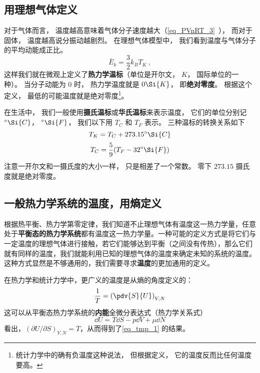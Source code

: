 

\subsection{用理想气体定义}
对于气体而言， 温度越高意味着气体分子速度越大（\autoref{eq_PVnRT_3}~）， 而对于固体， 温度越高说分振动越剧烈。 在理想气体模型中， 我们看到温度与气体分子的平均动能成正比。 
\begin{equation}
\bar E_k = \frac{3}{2} k_B T_K~,
\end{equation}
这样我们就在微观上定义了\textbf{热力学温标}（单位是开尔文， $K$， 国际单位的一种）。 当分子动能为 0 时， 热力学温度就是 $0 \Si{K}$， 即\textbf{绝对零度}。 根据这个定义， 最低的可能温度就是绝对零度\footnote{统计力学中的确有负温度这种说法， 但根据定义， 它的温度反而比任何温度要高。}。

在生活中， 我们一般使用\textbf{摄氏温标}或\textbf{华氏温标}来表示温度， 它们的单位分别记 $^\circ\Si{C}$， $^\circ\Si{F}$， 我们以下用 $T_C$ 和 $T_F$ 表示。 三种温标的转换关系如下
\begin{equation}
T_K = T_C + 273.15^\circ\Si{C}
\end{equation}
\begin{equation}
T_C = \frac{5}{9}(T_F - 32^\circ\Si{F})
\end{equation}
注意一开尔文和一摄氏度的大小一样， 只是相差了一个常数。 零下 $273.15$ 摄氏度就是绝对零度。

\subsection{一般热力学系统的温度，用熵定义}
根据热平衡、热力学第零定律，我们知道不止理想气体有温度这一热力学量，任意处于\textbf{平衡态的热力学系统}都有温度这一热力学量。一种可能的定义方式是将它们与一定温度的理想气体进行接触，若它们能够达到平衡（之间没有传热），那么它们就有同样的温度，我们就能利用已知的理想气体的温度来确定未知的系统的温度。这种方式显然是不够通用的，我们需要寻求\textbf{温度}的更加通用的定义。

在热力学和统计力学中，更广义的温度是从熵的角度定义的：
\begin{equation}\label{eq_tmp_1}
\frac{1}{T} = \left(\pdv{S}{U}\right)_{V,N} 
\end{equation}
这可以从平衡态热力学系统的\textbf{内能}全微分表达式（热力学关系式）
\begin{equation}
\dd U=T\dd S-p\dd V+\mu \dd N
\end{equation}
看出，$(\partial U/\partial S)_{V,N}=T$，从而得到了\autoref{eq_tmp_1} 的结果。

